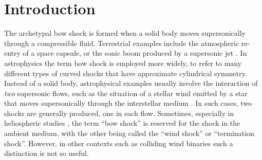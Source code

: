 \section{Introduction}
\label{sec:intro}


The archetypal bow shock is formed when a solid body moves
supersonically through a compressible fluid.  Terrestrial examples
include the atmospheric re-entry of a space capsule, or the sonic boom
produced by a supersonic jet \citep{van-Dyke:1982a}.  In astrophysics
the term bow shock is employed more widely, to refer to many different
types of curved shocks that have approximate cylindrical symmetry.
Instead of a solid body, astrophysical examples usually involve the
interaction of \emph{two} supersonic flows, such as the situation of a
stellar wind emitted by a star that moves supersonically through the
interstellar medium \citep{van-Buren:1988a, Kobulnicky:2010a,
  van-Marle:2011a, Mackey:2012b, Mackey:2015a}.  In such cases, two
shocks are generally produced, one in each flow.  Sometimes,
especially in heliospheric studies \citep{Zank:1999a, Scherer:2014a},
the term ``bow shock'' is reserved for the shock in the ambient
medium, with the other being called the ``wind shock'' or
``termination shock''.  However, in other contexts such as colliding
wind binaries \citep{Stevens:1992a, Gayley:2009a} such a distinction
is not so useful.  


